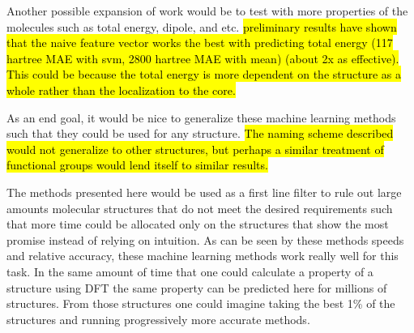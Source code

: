 \documentclass[10pt]{article}
\begin{document}


Another possible expansion of work would be to test with more properties of the molecules such as total energy, dipole, and etc. \hl{preliminary results have shown that the naive feature vector works the best with predicting total energy (117 hartree MAE with svm, 2800 hartree MAE with mean) (about 2x as effective). This could be because the total energy is more dependent on the structure as a whole rather than the localization to the core.}

As an end goal, it would be nice to generalize these machine learning methods such that they could be used for any structure. \hl{The naming scheme described would not generalize to other structures, but perhaps a similar treatment of functional groups would lend itself to similar results.}

The methods presented here would be used as a first line filter to rule out large amounts molecular structures that do not meet the desired requirements such that more time could be allocated only on the structures that show the most promise instead of relying on intuition. As can be seen by these methods speeds and relative accuracy, these machine learning methods work really well for this task. In the same amount of time that one could calculate a property of a structure using DFT the same property can be predicted here for millions of structures. From those structures one could imagine taking the best 1\% of the structures and running progressively more accurate methods.
\end{document}
